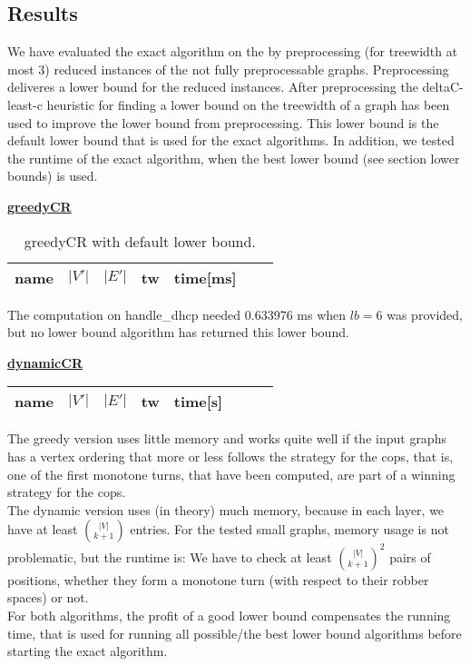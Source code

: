 \documentclass[a4wide]{article}
\begin{document}
\newpage

\subsection{Results}

We have evaluated the exact algorithm on the by preprocessing (for treewidth at most 3) reduced instances of the not fully preprocessable graphs. Preprocessing deliveres a lower bound for the reduced instances. After preprocessing the deltaC-least-c heuristic for finding a lower bound on the treewidth of a graph has been used to improve the lower bound from preprocessing. This lower bound is the default lower bound that is used for the exact algorithms. In addition, we tested the runtime of the exact algorithm, when the best lower bound (see section lower bounds) is used.

\begin{table}[h!]
\underline{\textbf{greedyCR}} \\
\begin{tabular}{|l|l|l|l|l|l|l|}
\hline
name & $|V'|$ & $|E'|$ & tw & time[ms] \\
\hline
\hline   

\hline
\end{tabular}
\caption{greedyCR with default lower bound.}
\end{table}

The computation on handle\_dhcp needed 0.633976 ms when $lb=6$ was provided, but no lower bound algorithm has returned this lower bound.

\begin{table}[h!]
\underline{\textbf{dynamicCR}} \\
\begin{tabular}{|l|l|l|l|l|l|l|l|}
\hline
name & $|V'|$ & $|E'|$ & tw & time[s] \\
\hline
\hline   

\hline
\end{tabular}
\end{table}

\newpage

The greedy version uses little memory and works quite well if the input graphs has a vertex ordering that more or less follows the strategy for the cops, that is, one of the first monotone turns, that have been computed, are part of a winning strategy for the cops. \\
The dynamic version uses (in theory) much memory, because in each layer, we have at least $\binom{|V|}{k+1}$ entries. For the tested small graphs, memory usage is not problematic, but the runtime is: We have to check at least ${\binom{|V|}{k+1}}^{2}$ pairs of positions, whether they form a monotone turn (with respect to their robber spaces) or not. \\
For both algorithms, the profit of a good lower bound compensates the running time, that is used for running all possible/the best lower bound algorithms before starting the exact algorithm.
\end{document}
